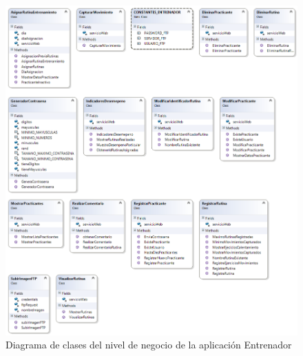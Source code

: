 \begin{figure}[H]
	\begin{center}
		\includegraphics[scale=0.6]{./Figuras/Arquitectura/Negocio_Entrenador}
	\end{center}
	\caption{Diagrama de clases del nivel de negocio de la aplicación Entrenador}
	\label{fig:DCE_Negocio}
\end{figure}

